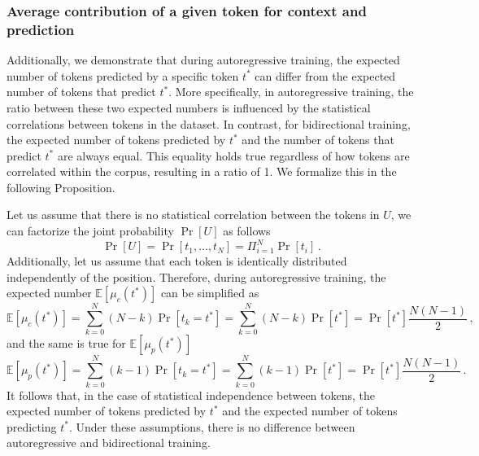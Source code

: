 \subsubsection{Average contribution of a given token for context and prediction}
\label{supp-math-prop-counting-prediction-context}
%
Additionally, we demonstrate that during autoregressive training, the expected number of tokens predicted by a specific token $t^*$ can differ from the expected number of tokens that predict $t^*$.
%
More specifically, in autoregressive training, the ratio between these two expected numbers is influenced by the statistical correlations between tokens in the dataset.
%
In contrast, for bidirectional training, the expected number of tokens predicted by $t^*$ and the number of tokens that predict $t^*$ are always equal. 
%
This equality holds true regardless of how tokens are correlated within the corpus, resulting in a ratio of 1.
%
We formalize this in the following Proposition.
%


%

Let us assume that there is no statistical correlation between the tokens in $U$, we can factorize the joint probability $\Pr[U]$ as follows
%
\begin{equation}
    \Pr[U] = \Pr[t_1,\dots,t_N] = \Pi_{i=1}^N\Pr[t_i]\,.
\end{equation}
%
Additionally, let us assume that each token is identically distributed independently of the position.
%
Therefore, during autoregressive training, the expected number  $\mathbb{E}[\mu_c(t^*)]$ can be simplified as
%
\begin{equation}
\mathbb{E}[\mu_c(t^*)] = \sum_{k=0}^N(N-k)\Pr[t_k = t^*] = \sum_{k=0}^N(N-k)\Pr[t^*] = \Pr[t^*]\frac{N(N-1)}{2} \,,
\end{equation}
%
and the same is true for $\mathbb{E}[\mu_p(t^*)]$
%
\begin{equation}
\mathbb{E}[\mu_p(t^*)] = \sum_{k=0}^N(k-1)\Pr[t_k = t^*] = \sum_{k=0}^N(k-1)\Pr[t^*] = \Pr[t^*]\frac{N(N-1)}{2} \,.
\end{equation}
%
It follows that, in the case of statistical independence between tokens, the expected number of tokens predicted by $t^*$ and the expected number of tokens predicting $t^*$.
%
Under these assumptions, there is no difference between autoregressive and bidirectional training.

